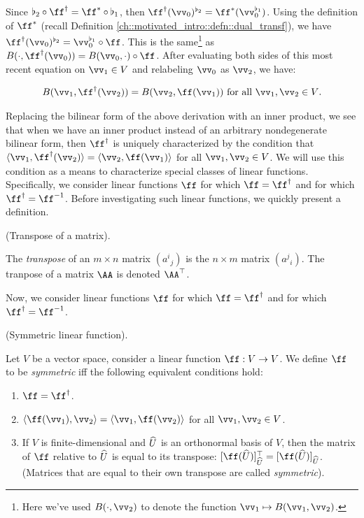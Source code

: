 \begin{deriv}
    Since $\flat_2 \circ \ff^\dag = \ff^* \circ \flat_1$, then $\ff^\dag(\vv_0)^{\flat_2} = \ff^*(\vv_0^{\flat_1})$. Using the definition of $\ff^*$ (recall Definition \ref{ch::motivated_intro::defn::dual_transf}), we have $\ff^\dag(\vv_0)^{\flat_2} = \vv_0^{\flat_1} \circ \ff$. This is the same\footnote{Here we've used $B(\cdot, \vv_2)$ to denote the function $\vv_1 \mapsto B(\vv_1, \vv_2)$.} as $B(\cdot, \ff^\dag(\vv_0)) = B(\vv_0, \cdot) \circ \ff$. After evaluating both sides of this most recent equation on $\vv_1 \in V$ and relabeling $\vv_0$ as $\vv_2$, we have:
    
    \begin{align*}
        B(\vv_1, \ff^\dag(\vv_2)) = B(\vv_2, \ff(\vv_1)) \text{ for all $\vv_1, \vv_2 \in V$}.
    \end{align*}
\end{deriv}

Replacing the bilinear form of the above derivation with an inner product, we see that when we have an inner product instead of an arbitrary nondegenerate bilinear form, then $\ff^\dag$ is uniquely characterized by the condition that $\langle \vv_1, \ff^\dag(\vv_2) \rangle = \langle \vv_2, \ff(\vv_1) \rangle$ for all $\vv_1, \vv_2 \in V$. We will use this condition as a means to characterize special classes of linear functions. Specifically, we consider linear functions $\ff$ for which $\ff = \ff^\dag$ and for which $\ff^\dag = \ff^{-1}$. Before investigating such linear functions, we quickly present a definition.

\begin{defn}
    (Transpose of a matrix).
    
    The \textit{transpose} of an $m \times n$ matrix $(a^i{}_j)$ is the $n \times m$ matrix $(a^j{}_i)$. The tranpose of a matrix $\AA$ is denoted $\AA^\top$.
\end{defn}

Now, we consider linear functions $\ff$ for which $\ff = \ff^\dag$ and for which $\ff^\dag = \ff^{-1}$.

\begin{defn} 
\label{ch::bilinear_forms_metric_tensors::defn::symmetric_linear_fn}
    (Symmetric linear function).

    Let $V$ be a vector space, consider a linear function $\ff:V \rightarrow V$. We define $\ff$ to be \textit{symmetric} iff the following equivalent conditions hold:
    
    \begin{enumerate}
        \item $\ff = \ff^\dag$.
        \item $\langle \ff(\vv_1), \vv_2 \rangle = \langle \vv_1, \ff(\vv_2) \rangle$ for all $\vv_1, \vv_2 \in V$.
        \item If $V$ is finite-dimensional and $\widehat{U}$ is an orthonormal basis of $V$, then the matrix of $\ff$ relative to $\widehat{U}$ is equal to its transpose: $[\ff(\hU)]_{\hU}^\top = [\ff(\hU)]_{\hU}$. (Matrices that are equal to their own transpose are called \textit{symmetric}).
    \end{enumerate}
\end{defn}
        
